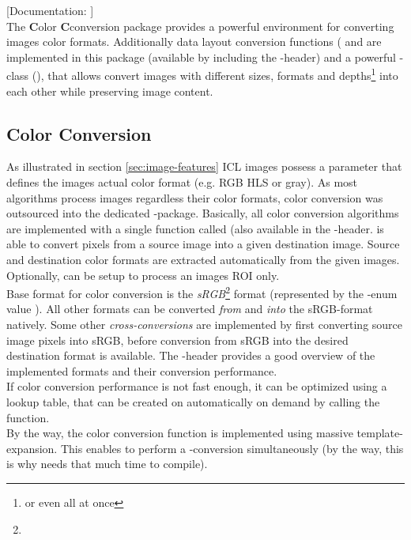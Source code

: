 [Documentation: ]\\
The \textbf{C}olor \textbf{C}conversion package provides a powerful environment for converting images color formats. Additionally data layout conversion functions ( and  are implemented in this package (available by including the -header) and a powerful -class (), that allows convert images with different sizes, formats and depths\footnote{or even all at once} into each other while preserving image content.


\subsection{Color Conversion}

As illustrated in section \ref{sec:image-features} ICL images possess a  parameter that defines the images actual color format (e.g. RGB HLS or gray). As most algorithms process images regardless their color formats, color conversion was outsourced into the dedicated -package. Basically, all color conversion algorithms are implemented with a single function called  (also available in the -header.  is able to convert pixels from a source image into a given destination image. Source and destination color formats are extracted automatically from the given images. Optionally,  can be setup to process an images ROI only.\\
Base format for color conversion is the \emph{sRGB}\footnote{} format (represented by the -enum value ). All other formats can be converted \emph{from} and \emph{into} the sRGB-format natively. Some other \emph{cross-conversions} are implemented by first converting source image pixels into sRGB, before conversion from sRGB into the desired destination format is available. The -header provides a good overview of the implemented formats and their conversion performance.\\
If color conversion performance is not fast enough, it can be optimized using a lookup table, that can be created on automatically on demand by calling the  function.\\
By the way, the color conversion function  is implemented using massive template-expansion. This enables  to perform a -conversion simultaneously (by the way, this is why  needs that much time to compile).

